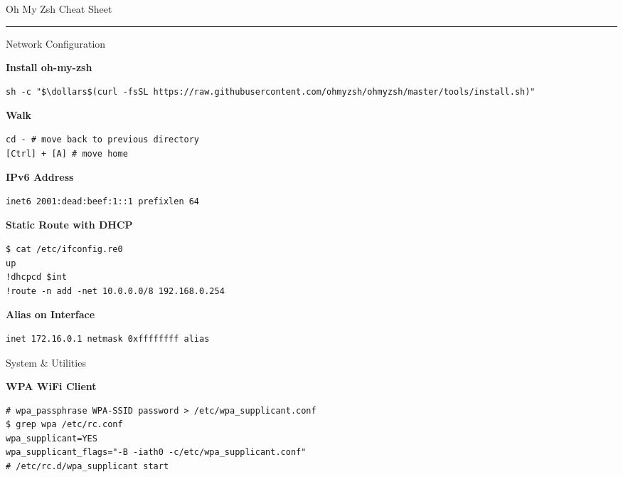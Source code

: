 \documentclass[10pt]{article}
\begin{document}
\pagestyle{empty}

{\titlefont\large \color{mygreen}Oh My Zsh Cheat Sheet}\\
\rule{\linewidth}{0.5pt}
\vspace{0.5em}

\setlength{\columnsep}{20pt}
\begin{multicols}{2}

{\titlefont\color{blueheader}\faNetworkWired\quad Network Configuration}\vspace{5pt}

\textbf{\color{blueheader}Install oh-my-zsh}
\begin{lstlisting}
sh -c "$\dollars$(curl -fsSL https://raw.githubusercontent.com/ohmyzsh/ohmyzsh/master/tools/install.sh)"
\end{lstlisting}

  \textbf{\color{blueheader}Walk}
\begin{lstlisting}
cd - # move back to previous directory
[Ctrl] + [A] # move home
\end{lstlisting}

\textbf{\color{blueheader}IPv6 Address}
\begin{lstlisting}
inet6 2001:dead:beef:1::1 prefixlen 64
\end{lstlisting}

\textbf{\color{blueheader}Static Route with DHCP}
\begin{lstlisting}
$ cat /etc/ifconfig.re0  
up  
!dhcpcd $int
!route -n add -net 10.0.0.0/8 192.168.0.254
\end{lstlisting}

\textbf{\color{blueheader}Alias on Interface}
\begin{lstlisting}
inet 172.16.0.1 netmask 0xffffffff alias
\end{lstlisting}

\vfill\null\columnbreak

{\titlefont\color{blueheader}\faTools\quad System & Utilities}\vspace{5pt}

\textbf{\color{blueheader}WPA WiFi Client}
\begin{lstlisting}
# wpa_passphrase WPA-SSID password > /etc/wpa_supplicant.conf
$ grep wpa /etc/rc.conf
wpa_supplicant=YES
wpa_supplicant_flags="-B -iath0 -c/etc/wpa_supplicant.conf"
# /etc/rc.d/wpa_supplicant start
\end{lstlisting}


\end{multicols}
\end{document}
